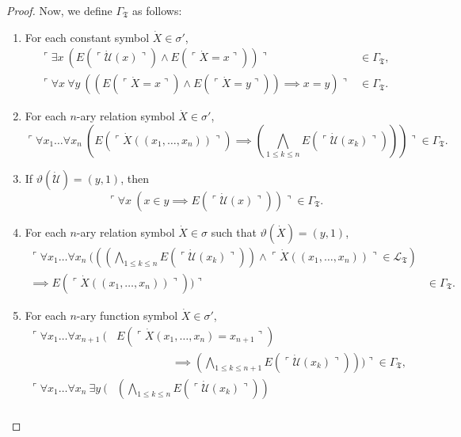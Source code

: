 \documentclass[12pt, twoside]{memoir}
\numberwithin{equation}{section}
\theoremstyle{definition}
\theoremstyle{remark}
\theoremstyle{definition}
\theoremstyle{definition}
\theoremstyle{definition}
\theoremstyle{remark}
\begin{document}
\begin{proof}
Now, we define $\Gamma_{\mathfrak{T}}$ as follows:
\begin{enumerate}[label=(\arabic*)]
    \item\label{gamma1} For each constant symbol $\dot{X} \in \sigma'$,
    \begin{align*}
        \ulcorner \exists x \ (E(\ulcorner \dot{\mathcal{U}}(x) \urcorner) \wedge E(\ulcorner \dot{X} = x \urcorner)) \urcorner & \in \Gamma_{\mathfrak{T}}, \\
        \ulcorner \forall x \ \forall y \ ((E(\ulcorner \dot{X} = x \urcorner) \wedge E(\ulcorner \dot{X} = y \urcorner)) \implies x = y) \urcorner & \in \Gamma_{\mathfrak{T}}.
    \end{align*}
    \item For each $n$-ary relation symbol $\dot{X} \in \sigma'$, $$\ulcorner \forall x_1 \dots \forall x_n \ (E(\ulcorner \dot{X}((x_1, \dots, x_n)) \urcorner) \implies (\bigwedge_{1 \leq k \leq n} E(\ulcorner \dot{\mathcal{U}}(x_k) \urcorner))) \urcorner \in \Gamma_{\mathfrak{T}}.$$
    \item\label{gammaform3} If $\vartheta(\dot{\mathcal{U}}) = (y, 1)$, then $$\ulcorner \forall x \ (x \in y \implies E(\ulcorner \dot{\mathcal{U}}(x) \urcorner)) \urcorner \in \Gamma_{\mathfrak{T}}.$$
    \item\label{gammaform4} For each $n$-ary relation symbol $\dot{X} \in \sigma$ such that $\vartheta(\dot{X}) = (y, 1)$, 
    \begin{align*}
        \ulcorner \forall x_1 \dots \forall x_n \ (((\bigwedge_{1 \leq k \leq n} E(\ulcorner \dot{\mathcal{U}}(x_k) \urcorner)) \wedge \ulcorner \dot{X}((x_1, \dots, x_n)) \urcorner \in \mathcal{L}_{\mathfrak{T}}) & \\
        \implies E(\ulcorner \dot{X}((x_1, \dots, x_n)) \urcorner)) \urcorner & \in \Gamma_{\mathfrak{T}}.
    \end{align*}
    \item For each $n$-ary function symbol $\dot{X} \in \sigma'$, 
    \begin{align*}
        \ulcorner \forall x_1 \dots \forall x_{n+1} \ ( & E(\ulcorner \dot{X} (x_1, \dots, x_n) = x_{n+1} \urcorner) \\
        & \mspace{90mu} \implies (\bigwedge_{1 \leq k \leq n+1} E(\ulcorner \dot{\mathcal{U}}(x_k) \urcorner))) \urcorner \in \Gamma_{\mathfrak{T}}, \\
        \ulcorner \forall x_1 \dots \forall x_n \ \exists y \ ( & (\bigwedge_{1 \leq k \leq n} E(\ulcorner \dot{\mathcal{U}}(x_k) \urcorner)) \\

\end{align*}
\end{enumerate}
\end{proof}
\end{document}
